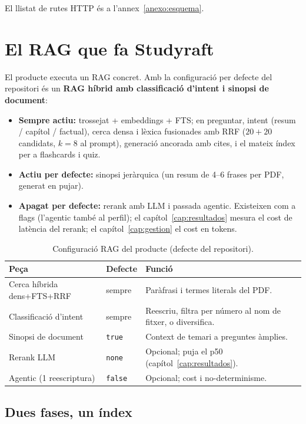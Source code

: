El llistat de rutes HTTP és a l'annex~\ref{anexo:esquema}.

\section{El RAG que fa Studyraft}
\label{sec:rag-dos-temps}

El producte executa un RAG concret. Amb la configuració per defecte del repositori és un \textbf{RAG híbrid amb classificació d'intent i sinopsi de document}:

\begin{itemize}
  \item \textbf{Sempre actiu:} trossejat + embeddings + FTS; en preguntar, intent (resum / capítol / factual), cerca densa i lèxica fusionades amb RRF ($20+20$ candidats, $k=8$ al prompt), generació ancorada amb cites, i el mateix índex per a flashcards i quiz.
  \item \textbf{Actiu per defecte:} sinopsi jeràrquica (un resum de 4--6 frases per PDF, generat en pujar).
  \item \textbf{Apagat per defecte:} rerank amb LLM i passada agentic. Existeixen com a flags (l'agentic també al perfil); el capítol~\ref{cap:resultados} mesura el cost de latència del rerank; el capítol~\ref{cap:gestion} el cost en tokens.
\end{itemize}

\begin{table}[htbp]
\centering
\caption{Configuració RAG del producte (defecte del repositori).}
\label{tab:rag-defecte}
\small
\begin{tabularx}{\textwidth}{l l X}
\toprule
Peça & Defecte & Funció \\
\midrule
Cerca híbrida dens+FTS+RRF & sempre & Paràfrasi i termes literals del PDF. \\
Classificació d'intent & sempre & Reescriu, filtra per número al nom de fitxer, o diversifica. \\
Sinopsi de document & \texttt{true} & Context de temari a preguntes àmplies. \\
Rerank LLM & \texttt{none} & Opcional; puja el p50 (capítol~\ref{cap:resultados}). \\
Agentic (1 reescriptura) & \texttt{false} & Opcional; cost i no-determinisme. \\
\bottomrule
\end{tabularx}
\end{table}

\subsection{Dues fases, un índex}

